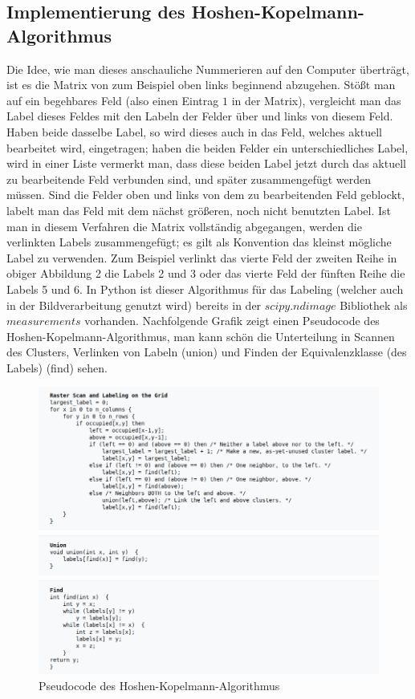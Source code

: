\documentclass[a4paper, 12pt]{report}
\begin{document}
\subsection{Implementierung des Hoshen-Kopelmann-Algorithmus}
Die Idee, wie man dieses anschauliche Nummerieren auf den Computer überträgt, ist es die Matrix von zum Beispiel oben links beginnend abzugehen. Stößt man auf ein begehbares Feld (also einen Eintrag $1$ in der Matrix), vergleicht man das Label dieses Feldes mit den Labeln der Felder über und links von diesem Feld. Haben beide dasselbe Label, so wird dieses auch in das Feld, welches aktuell bearbeitet wird, eingetragen; haben die beiden Felder ein unterschiedliches Label, wird in einer Liste vermerkt man, dass diese beiden Label jetzt durch das aktuell zu bearbeitende Feld verbunden sind, und später zusammengefügt werden müssen. Sind die Felder oben und links von dem zu bearbeitenden Feld geblockt, labelt man das Feld mit dem nächst größeren, noch nicht benutzten Label. Ist man in diesem Verfahren die Matrix vollständig abgegangen, werden die verlinkten Labels zusammengefügt; es gilt als Konvention das kleinst mögliche Label zu verwenden. Zum Beispiel verlinkt das vierte Feld der zweiten Reihe in obiger Abbildung 2 die Labels 2 und 3 oder das vierte Feld der fünften Reihe die Labels 5 und 6.
\noindent In Python ist dieser Algorithmus für das Labeling (welcher auch in der Bildverarbeitung genutzt wird) bereits in der $scipy.ndimage$ Bibliothek als $measurements$ vorhanden. Nachfolgende Grafik zeigt einen Pseudocode\cite{Fricke} des Hoshen-Kopelmann-Algorithmus, man kann schön die Unterteilung in Scannen des Clusters, Verlinken von Labeln (union) und Finden der Equivalenzklasse (des Labels) (find) sehen.\newpage

\begin{figure}
	\centering
	\includegraphics[scale=0.7]{HSK_pseudocode.png}
	\caption{Pseudocode des Hoshen-Kopelmann-Algorithmus}
\end{figure}
\end{document}
